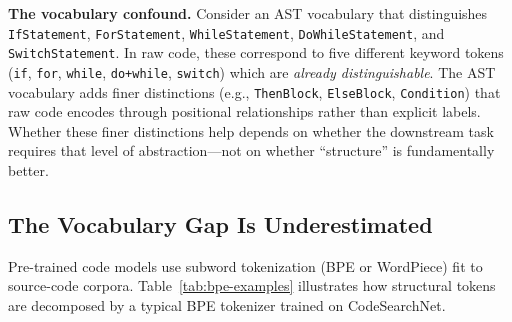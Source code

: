 \documentclass[pdflatex,sn-mathphys,Numbered]{sn-jnl}
\begin{document}
\textbf{The vocabulary confound.} Consider an AST vocabulary that distinguishes \texttt{IfStatement}, \texttt{ForStatement}, \texttt{WhileStatement}, \texttt{DoWhileStatement}, and \texttt{SwitchStatement}. In raw code, these correspond to five different keyword tokens (\texttt{if}, \texttt{for}, \texttt{while}, \texttt{do+while}, \texttt{switch}) which are \emph{already distinguishable}. The AST vocabulary adds finer distinctions (e.g., \texttt{ThenBlock}, \texttt{ElseBlock}, \texttt{Condition}) that raw code encodes through positional relationships rather than explicit labels. Whether these finer distinctions help depends on whether the downstream task requires that level of abstraction---not on whether ``structure'' is fundamentally better.

\subsection{The Vocabulary Gap Is Underestimated}
\label{sec:motive-vocab}

Pre-trained code models use subword tokenization (BPE or WordPiece) fit to source-code corpora. Table~\ref{tab:bpe-examples} illustrates how structural tokens are decomposed by a typical BPE tokenizer trained on CodeSearchNet.
\end{document}
